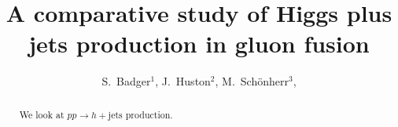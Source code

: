 \documentclass[11pt]{cernrep}
\begin{document}
\title{A comparative study of Higgs plus jets production in gluon fusion}

\author{
  S.\ Badger$^1$,
  J.\ Huston$^2$,
  M.\ Sch\"onherr$^3$,
}

\maketitle

\begin{abstract}
  We look at $pp\to h + \text{jets}$ production.
\end{abstract}






\end{document}

